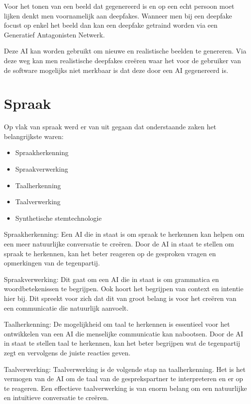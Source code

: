 Voor het tonen van een beeld dat gegenereerd is en op een echt persoon moet lijken denkt men voornamelijk aan deepfakes. Wanneer men bij een deepfake focust op enkel het beeld dan kan een deepfake getraind worden via een Generatief Antagonisten Netwerk.

Deze AI kan worden gebruikt om nieuwe en realistische beelden te genereren. Via deze weg kan men realistische deepfakes creëren waar het voor de gebruiker van de software mogelijks niet merkbaar is dat deze door een AI gegenereerd is.

\newpage

\section{Spraak}

Op vlak van spraak werd er van uit gegaan dat onderstaande zaken het belangrijkste waren:

\begin{itemize}
    \item Spraakherkenning
    \item Spraakverwerking
    \item Taalherkenning
    \item Taalverwerking
    \item Synthetische stemtechnologie
\end{itemize}

Spraakherkenning: Een AI die in staat is om spraak te herkennen kan helpen om een meer natuurlijke conversatie te creëren. Door de AI in staat te stellen om spraak te herkennen, kan het beter reageren op de gesproken vragen en opmerkingen van de tegenpartij.

Spraakverwerking: Dit gaat om een AI die in staat is om grammatica en woordbetekenissen te begrijpen. Ook hoort het begrijpen van context en intentie hier bij. Dit spreekt voor zich dat dit van groot belang is voor het creëren van een communicatie die natuurlijk aanvoelt.

Taalherkenning: De mogelijkheid om taal te herkennen is essentieel voor het ontwikkelen van een AI die menselijke communicatie kan nabootsen. Door de AI in staat te stellen taal te herkennen, kan het beter begrijpen wat de tegenpartij zegt en vervolgens de juiste reacties geven.

Taalverwerking: Taalverwerking is de volgende stap na taalherkenning. Het is het vermogen van de AI om de taal van de gesprekspartner te interpreteren en er op te reageren. Een effectieve taalverwerking is van enorm belang om een natuurlijke en intuïtieve conversatie te creëren.

